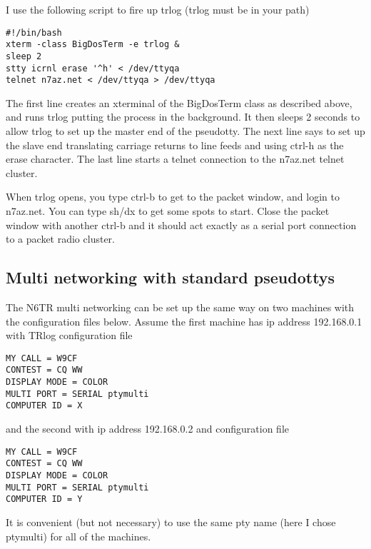 \documentclass[12pt]{article}
\begin{document}
I use the following script to fire up trlog (trlog must be in your path)
\begin{verbatim}
#!/bin/bash
xterm -class BigDosTerm -e trlog &
sleep 2
stty icrnl erase '^h' < /dev/ttyqa
telnet n7az.net < /dev/ttyqa > /dev/ttyqa
\end{verbatim}
The first line creates an xterminal of the BigDosTerm class as described
above, and runs trlog putting the process in the background.
It then sleeps 2 seconds to allow trlog to set up the master end of the
pseudotty. The next line says to set up the slave end translating
carriage returns to line feeds and using ctrl-h as the erase character.
The last line starts a telnet connection to the n7az.net telnet cluster.

When trlog opens, you type ctrl-b to get to the packet window, and login
to n7az.net. You can type sh/dx to get some spots to start. Close the
packet window with another ctrl-b and it should act exactly as a serial
port connection to a packet radio cluster.

\subsection{Multi networking with standard pseudottys}
The N6TR multi networking can be set up the same way on two machines
with the configuration files below. Assume the first machine has ip
address 192.168.0.1 with TRlog configuration file
\begin{verbatim}
MY CALL = W9CF
CONTEST = CQ WW
DISPLAY MODE = COLOR
MULTI PORT = SERIAL ptymulti
COMPUTER ID = X
\end{verbatim}
and the second with ip address 192.168.0.2 and configuration file
\begin{verbatim}
MY CALL = W9CF
CONTEST = CQ WW
DISPLAY MODE = COLOR
MULTI PORT = SERIAL ptymulti
COMPUTER ID = Y
\end{verbatim}
It is convenient (but not necessary)
to use the same pty name (here I chose ptymulti) for all
of the machines.
\end{document}
